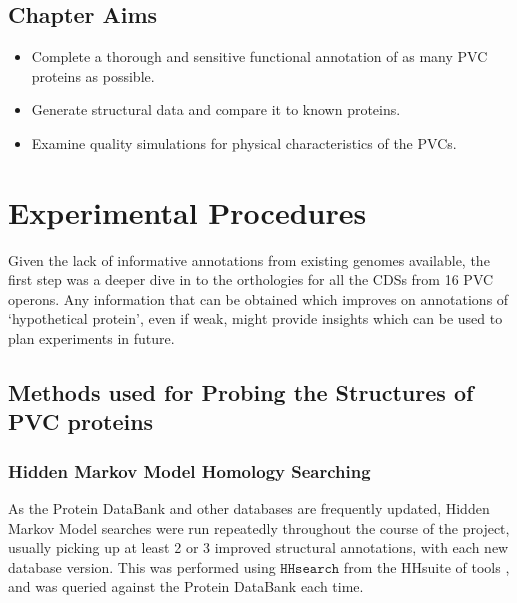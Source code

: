 \subsection*{Chapter Aims}

\begin{itemize}
	\item Complete a thorough and sensitive functional annotation of as many PVC proteins as possible.
	\item Generate structural data and compare it to known proteins.
	\item Examine quality simulations for physical characteristics of the PVCs.

\end{itemize}

\clearpage

\section{Experimental Procedures}
Given the lack of informative annotations from existing genomes available, the first step was a deeper dive in to the orthologies for all the CDSs from 16 PVC operons. Any information that can be obtained which improves on annotations of `hypothetical protein', even if weak, might provide insights which can be used to plan experiments in future.

\subsection{Methods used for Probing the Structures of PVC proteins}
\subsubsection{Hidden Markov Model Homology Searching}\label{hhresults}
As the Protein DataBank and other databases are frequently updated, Hidden Markov Model searches were run repeatedly throughout the course of the project, usually picking up at least 2 or 3 improved structural annotations, with each new database version. This was performed using $\mathtt{HHsearch}$ from the HHsuite of tools \citep{Remmert2012}, and was queried against the Protein DataBank each time.
	
